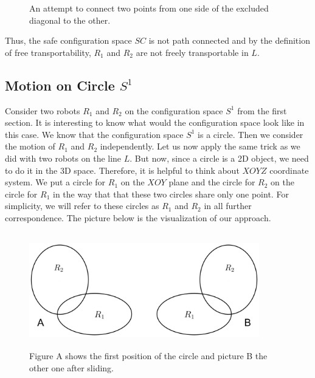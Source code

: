 \documentclass[12pt]{article}
\theoremstyle{definition}
\begin{document}
\begin{figure}[H]
    \centering
    \caption*{An attempt to connect two points from one side of the excluded diagonal to the other.}
\end{figure}

Thus, the safe configuration space $SC$ is not path connected and by the definition of
free transportability, $R_1$ and $R_2$ are not freely transportable in $L$.

\subsection*{\centering Motion on Circle $S^1$}

Consider two robots $R_1$ and $R_2$ on the configuration space $S^1$ from the first section.
It is interesting to know what would the configuration space look like in this case.
We know that the configuration space $S^1$ is a circle. Then we consider the motion of $R_1$ and $R_2$ independently.
Let us now apply the same trick as we did with two robots on the line $L$. But now, since a circle is a 2D object,
we need to do it in the 3D space. Therefore, it is helpful to think about $XOYZ$ coordinate system.
We put a circle for $R_1$ on the $XOY$ plane and the circle for $R_2$ on the circle for $R_1$ in the way that
that these two circles share only one point. For simplicity, we will refer to these circles as $R_1$ and $R_2$
in all further correspondence. The picture below is the visualization of our approach.

\begin{figure}[H]
    \centering
    \includegraphics[width=10cm, height=5cm]{image/two-circles}
    \caption*{Figure A shows the first position of the circle and picture B the other one after sliding.}
\end{figure}
\end{document}

